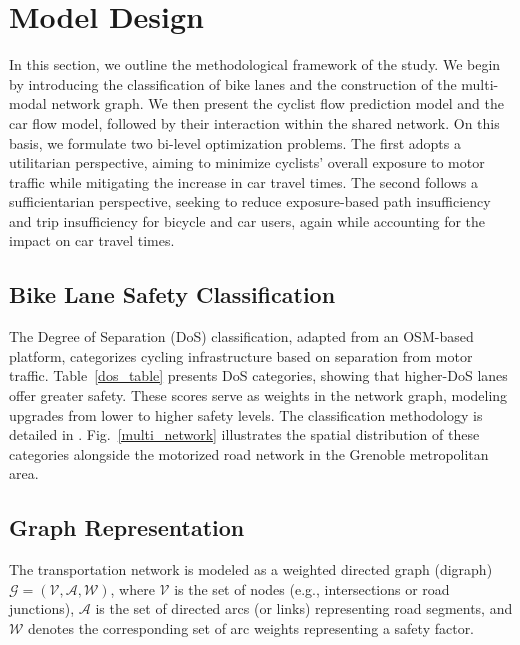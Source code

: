 \documentclass[lettersize,journal]{IEEEtran}
\begin{document}
\section{Model Design}
\label{model_design}
In this section, we outline the methodological framework of the study. We begin by introducing the classification of bike lanes and the construction of the multi-modal network graph. We then present the cyclist flow prediction model and the car flow model, followed by their interaction within the shared network. On this basis, we formulate two bi-level optimization problems. The first adopts 
a utilitarian perspective, aiming to minimize cyclists’ overall exposure to motor traffic while mitigating the increase in car travel times. The second follows a sufficientarian perspective, seeking to reduce exposure-based path insufficiency and trip insufficiency for bicycle and car users, again while accounting for the impact on car travel times.

\subsection{Bike Lane  Safety Classification}

The Degree of Separation (DoS) classification, adapted from an OSM-based platform, categorizes cycling infrastructure based on separation from motor traffic. Table~\ref{dos_table} presents DoS categories, showing that higher-DoS lanes offer greater safety. These scores serve as weights in the network graph, modeling upgrades from lower to higher safety levels. The classification methodology is detailed in \cite{2024graphbased, jurado2025graph}. Fig.~\ref{multi_network} illustrates the spatial distribution of these categories alongside the motorized road network in the Grenoble metropolitan area.


\subsection{Graph Representation}
The transportation network is modeled as a weighted directed graph (digraph) $\mathcal{G} = (\mathcal{V}, \mathcal{A}, \mathcal{W})$, where $\mathcal{V}$ is the set of nodes (e.g., intersections or road junctions), $\mathcal{A}$ is the set of directed arcs (or links) representing road segments, and $\mathcal{W}$ denotes the corresponding set of arc weights representing a safety factor.
\end{document}
